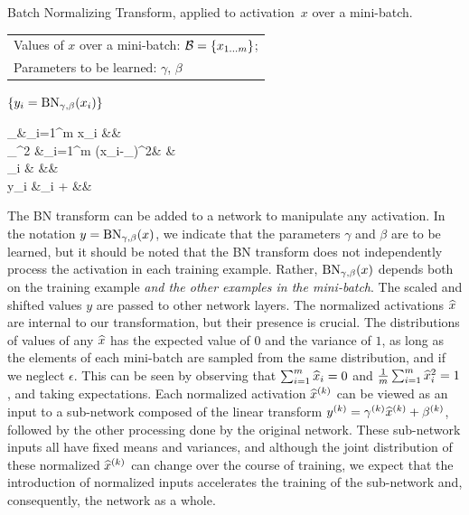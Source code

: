\documentclass[twocolumn]{article}
\begin{document}
\begin{algorithm}
  \caption{Batch Normalizing Transform, applied to \mbox{activation $x$} over a mini-batch. }
\label{alg-bn}
  \begin{algorithmic}
  \REQUIRE 
  \begin{tabular}[t]{@{}l}Values of   $x$ over a mini-batch:
  $\setB=\{x_{1\ldots m}\}$;\\ 
 Parameters to be learned: $\gamma$,
    $\beta$ \end{tabular}
  \ENSURE $\{y_i =  \BN{x_i}{\gamma,\beta}\}$
  \begin{flalign*}
      \mu_\setB &\leftarrow {}\sum_{i=1}^m x_i &&\\
  \sigma_\setB^2 &\leftarrow {}\sum_{i=1}^m (x_i-\mu_\setB)^2& &\\
\xhat_i &\leftarrow {}   
&&\\
  y_i &\leftarrow \gamma\xhat_i + \beta  
  \equiv{}
    &&
  \end{flalign*}
\end{algorithmic}
\end{algorithm}

The BN transform  can be added to a network to manipulate any activation. In the notation $y = \BN{x}{\gamma,\beta}$, we indicate that the parameters $\gamma$ and $\beta$ are to be learned, but it should be noted that the BN transform does not independently process the activation in each training example. Rather,  $\BN{x}{\gamma,\beta}$ depends both on the training example {\em and the other examples in the mini-batch}.
The scaled and shifted values $y$  are passed to other network layers. The normalized activations $\xhat$ are internal to our transformation, but their presence is crucial. The distributions of  values of any  $\xhat$ has the
expected value of $0$ and the variance of $1$, as long as the elements of each mini-batch are 
 sampled from the same distribution, and if we neglect $\epsilon$.  This can be seen by observing that $\sum_{i=1}^m \xhat_i = 0$ and
$\frac{1}{m}\sum_{i=1}^m \xhat_i^2 = 1$, and  taking expectations. Each normalized activation $\xhat^\kk$ can be viewed as an input to a sub-network composed of the linear transform $y^\kk=\gamma^\kk\xhat^\kk+\beta^\kk$, followed by the other processing done by the original network. These sub-network inputs all have fixed means and variances, and although the joint distribution of these normalized $\xhat^\kk$ can change over the course of  training, we expect that the introduction of  normalized inputs accelerates the training of the sub-network and, consequently, the network as a whole. 
  
\end{document}
